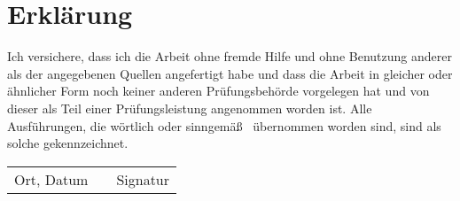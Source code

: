 \chapter*{Erklärung}

Ich versichere, dass ich die Arbeit ohne fremde Hilfe und ohne Benutzung anderer als der
angegebenen Quellen angefertigt habe und dass die Arbeit in gleicher oder ähnlicher Form
noch keiner anderen Prüfungsbehörde vorgelegen hat und von dieser als Teil einer
Prüfungsleistung angenommen worden ist. Alle Ausführungen, die wörtlich oder sinngemäß~
übernommen worden sind, sind als solche ge\-kenn\-zeich\-net.

\vspace{40pt}

\begin{center}
  \begin{tabular}{l p{} r}
    \cline{1-1} \cline{3-3}
    \begin{minipage}[t]{0.4\textwidth}
      \centering
    Ort, Datum
    \end{minipage}
    &
    \begin{minipage}[t]{0.2\textwidth}
    \end{minipage}
    &
    \begin{minipage}[t]{0.4\textwidth}
      \centering
    Signatur
    \end{minipage}
  \end{tabular}
\end{center}
